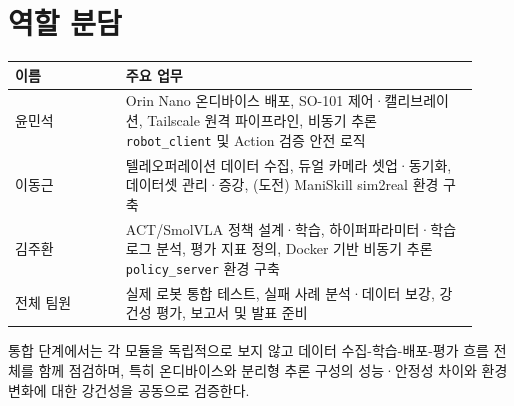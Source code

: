 \documentclass[titlepage]{pnureport}
\begin{document}
\chapter{역할 분담}

\begin{longtable}{p{0.22\linewidth}p{0.70\linewidth}}
\toprule
이름 & 주요 업무 \\
\midrule
\endhead
윤민석 & Orin Nano 온디바이스 배포, SO-101 제어·캘리브레이션, Tailscale 원격 파이프라인, 비동기 추론 \texttt{robot\_client} 및 Action 검증 안전 로직 \\
이동근 & 텔레오퍼레이션 데이터 수집, 듀얼 카메라 셋업·동기화, 데이터셋 관리·증강, (도전) ManiSkill sim2real 환경 구축 \\
김주환 & ACT/SmolVLA 정책 설계·학습, 하이퍼파라미터·학습 로그 분석, 평가 지표 정의, Docker 기반 비동기 추론 \texttt{policy\_server} 환경 구축 \\
전체 팀원 & 실제 로봇 통합 테스트, 실패 사례 분석·데이터 보강, 강건성 평가, 보고서 및 발표 준비 \\
\bottomrule
\end{longtable}

통합 단계에서는 각 모듈을 독립적으로 보지 않고 데이터 수집-학습-배포-평가 흐름 전체를 함께 점검하며, 특히 온디바이스와 분리형 추론 구성의 성능·안정성 차이와 환경 변화에 대한 강건성을 공동으로 검증한다.
\end{document}
